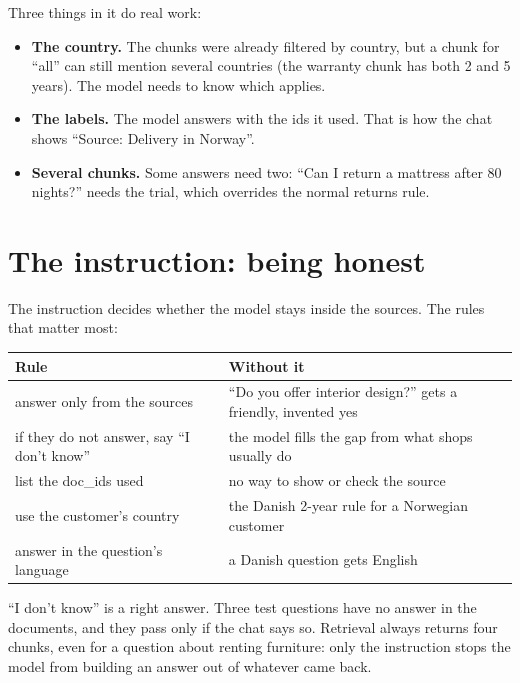 \documentclass[11pt]{article}
\begin{document}
Three things in it do real work:
\begin{itemize}[leftmargin=1.4em, itemsep=2pt]
\item \textbf{The country.} The chunks were already filtered by
  country, but a chunk for ``all'' can still mention several countries
  (the warranty chunk has both 2 and 5 years). The model needs to know
  which applies.
\item \textbf{The \code{[doc\_id]} labels.} The model answers with the
  ids it used. That is how the chat shows ``Source: Delivery in
  Norway''.
\item \textbf{Several chunks.} Some answers need two: ``Can I return a
  mattress after 80 nights?'' needs the trial, which overrides the
  normal returns rule.
\end{itemize}

\section{The instruction: being honest}

The instruction decides whether the model stays inside the sources.
The rules that matter most:

\begin{table}[H]
\small
\begin{tabularx}{\textwidth}{@{}X X@{}}
\toprule
Rule & Without it \\
\midrule
answer only from the sources & ``Do you offer interior design?'' gets
  a friendly, invented yes \\
if they do not answer, say ``I don't know'' & the model fills the gap
  from what shops usually do \\
list the doc\_ids used & no way to show or check the source \\
use the customer's country & the Danish 2-year rule for a Norwegian
  customer \\
answer in the question's language & a Danish question gets English \\
\bottomrule
\end{tabularx}
\end{table}

\begin{keypoint}
``I don't know'' is a right answer. Three test questions have no answer
in the documents, and they pass only if the chat says so. Retrieval
always returns four chunks, even for a question about renting
furniture: only the instruction stops the model from building an answer
out of whatever came back.
\end{keypoint}
\end{document}
